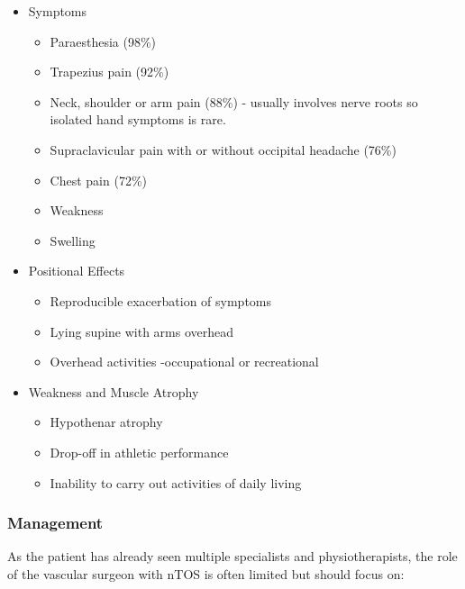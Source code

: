 \documentclass[
]{book}
\begin{document}
\begin{itemize}
\item
  Symptoms \citep{sadeghi-azandaryaniThoracicOutletSyndrome2009, sandersDiagnosisThoracicOutlet2007}

  \begin{itemize}
  \item
    Paraesthesia (98\%)
  \item
    Trapezius pain (92\%)
  \item
    Neck, shoulder or arm pain (88\%) - usually involves nerve roots
    so isolated hand symptoms is rare.
  \item
    Supraclavicular pain with or without occipital headache (76\%)
  \item
    Chest pain (72\%)
  \item
    Weakness
  \item
    Swelling
  \end{itemize}
\item
  Positional Effects

  \begin{itemize}
  \item
    Reproducible exacerbation of symptoms
  \item
    Lying supine with arms overhead
  \item
    Overhead activities -occupational or recreational
  \end{itemize}
\item
  Weakness and Muscle Atrophy

  \begin{itemize}
  \item
    Hypothenar atrophy
  \item
    Drop-off in athletic performance
  \item
    Inability to carry out activities of daily living
  \end{itemize}
\end{itemize}

\hypertarget{management-13}{%
\subsubsection{Management}\label{management-13}}

As the patient has already seen multiple specialists and
physiotherapists, the role of the vascular surgeon with nTOS is often
limited but should focus on:
\end{document}
